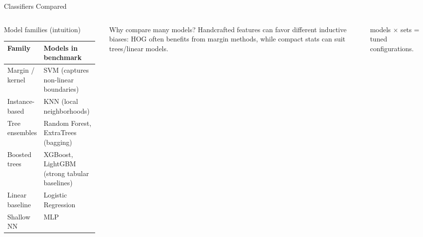 \begin{frame}[shrink=3]{Classifiers Compared}
  \begin{columns}[T,onlytextwidth]
    \begin{block}{Model families (intuition)}
      \small
      \begin{tabular}{@{}p{0.26\linewidth}p{0.70\linewidth}@{}}
        \toprule
        \textbf{Family} & \textbf{Models in benchmark} \\
        \midrule
        Margin / kernel & SVM (captures non-linear boundaries) \\
        Instance-based & KNN (local neighborhoods) \\
        Tree ensembles & Random Forest, ExtraTrees (bagging) \\
        Boosted trees & XGBoost, LightGBM (strong tabular baselines) \\
        Linear baseline & Logistic Regression \\
        Shallow NN & MLP \\
        \bottomrule
      \end{tabular}
    \end{block}

    \begin{block}{Why compare many models?}
      \small Handcrafted features can favor different inductive biases:
      HOG often benefits from margin methods, while compact stats can suit trees/linear models.
    \end{block}

    \centering

    \vspace{0.4em}
    {\small \NModels{} models $\times$ \NFeatureSets{} sets = \keyresult{\NRuns{}} tuned configurations.}
  \end{columns}
\end{frame}


